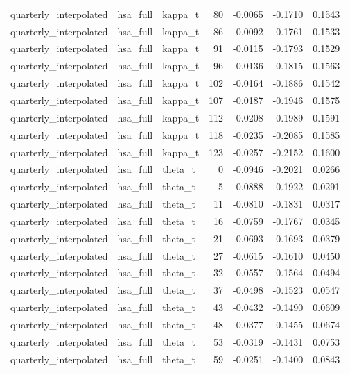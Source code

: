 \begin{tabular}{lllrrrr}
quarterly\_interpolated & hsa\_full & kappa\_t & 80 & -0.0065 & -0.1710 & 0.1543 \\
quarterly\_interpolated & hsa\_full & kappa\_t & 86 & -0.0092 & -0.1761 & 0.1533 \\
quarterly\_interpolated & hsa\_full & kappa\_t & 91 & -0.0115 & -0.1793 & 0.1529 \\
quarterly\_interpolated & hsa\_full & kappa\_t & 96 & -0.0136 & -0.1815 & 0.1563 \\
quarterly\_interpolated & hsa\_full & kappa\_t & 102 & -0.0164 & -0.1886 & 0.1542 \\
quarterly\_interpolated & hsa\_full & kappa\_t & 107 & -0.0187 & -0.1946 & 0.1575 \\
quarterly\_interpolated & hsa\_full & kappa\_t & 112 & -0.0208 & -0.1989 & 0.1591 \\
quarterly\_interpolated & hsa\_full & kappa\_t & 118 & -0.0235 & -0.2085 & 0.1585 \\
quarterly\_interpolated & hsa\_full & kappa\_t & 123 & -0.0257 & -0.2152 & 0.1600 \\
quarterly\_interpolated & hsa\_full & theta\_t & 0 & -0.0946 & -0.2021 & 0.0266 \\
quarterly\_interpolated & hsa\_full & theta\_t & 5 & -0.0888 & -0.1922 & 0.0291 \\
quarterly\_interpolated & hsa\_full & theta\_t & 11 & -0.0810 & -0.1831 & 0.0317 \\
quarterly\_interpolated & hsa\_full & theta\_t & 16 & -0.0759 & -0.1767 & 0.0345 \\
quarterly\_interpolated & hsa\_full & theta\_t & 21 & -0.0693 & -0.1693 & 0.0379 \\
quarterly\_interpolated & hsa\_full & theta\_t & 27 & -0.0615 & -0.1610 & 0.0450 \\
quarterly\_interpolated & hsa\_full & theta\_t & 32 & -0.0557 & -0.1564 & 0.0494 \\
quarterly\_interpolated & hsa\_full & theta\_t & 37 & -0.0498 & -0.1523 & 0.0547 \\
quarterly\_interpolated & hsa\_full & theta\_t & 43 & -0.0432 & -0.1490 & 0.0609 \\
quarterly\_interpolated & hsa\_full & theta\_t & 48 & -0.0377 & -0.1455 & 0.0674 \\
quarterly\_interpolated & hsa\_full & theta\_t & 53 & -0.0319 & -0.1431 & 0.0753 \\
quarterly\_interpolated & hsa\_full & theta\_t & 59 & -0.0251 & -0.1400 & 0.0843 \\

\end{tabular}
